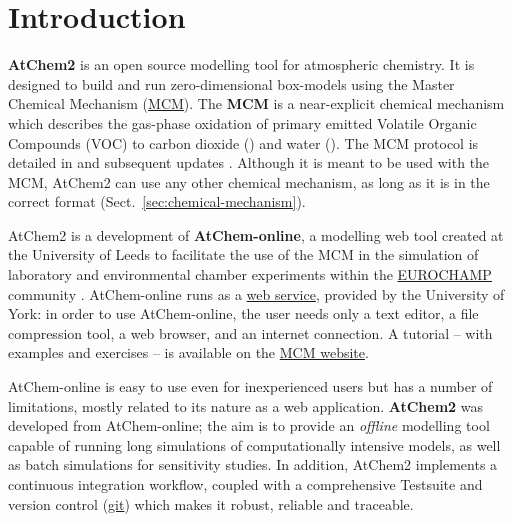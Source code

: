 %
%
%
%

\chapter{Introduction} \label{ch:introduction}

\textbf{AtChem2} is an open source modelling tool for atmospheric
chemistry. It is designed to build and run zero-dimensional
box-models using the Master Chemical Mechanism
(\href{https://mcm.york.ac.uk/MCM}{MCM}). The \textbf{MCM} is a
near-explicit chemical mechanism which describes the gas-phase
oxidation of primary emitted Volatile Organic Compounds (VOC) to
carbon dioxide () and water (). The MCM protocol is
detailed in \citet{jenkin_1997} and subsequent updates
\citep{saunders_2003, jenkin_2003, bloss_2005, jenkin_2012, jenkin_2015}.
Although it is meant to be used with the MCM, AtChem2 can use any
other chemical mechanism, as long as it is in the correct format
(Sect.~\ref{sec:chemical-mechanism}).

AtChem2 is a development of \textbf{AtChem-online}, a modelling web
tool created at the University of Leeds to facilitate the use of the
MCM in the simulation of laboratory and environmental chamber
experiments within the \href{https://www.eurochamp.org}{EUROCHAMP}
community \citep{martin_2009}. AtChem-online runs as a
\href{https://atchem.york.ac.uk}{web service}, provided by the
University of York: in order to use AtChem-online, the user needs only
a text editor, a file compression tool, a web browser, and an internet
connection. A tutorial -- with examples and exercises -- is available on
the \href{https://mcm.york.ac.uk/MCM/atchemonline/intro}{MCM website}.

AtChem-online is easy to use even for inexperienced users but has a
number of limitations, mostly related to its nature as a web
application. \textbf{AtChem2} was developed from AtChem-online; the
aim is to provide an \emph{offline} modelling tool capable of running
long simulations of computationally intensive models, as well as batch
simulations for sensitivity studies. In addition, AtChem2 implements a
continuous integration workflow, coupled with a comprehensive
Testsuite and version control (\href{https://git-scm.com}{git}) which
makes it robust, reliable and traceable.

